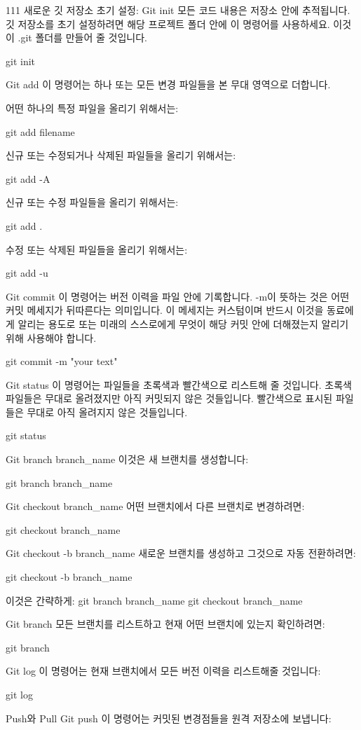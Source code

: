 111
새로운 깃 저장소 초기 설정: Git init
모든 코드 내용은 저장소 안에 추적됩니다. 깃 저장소를 초기 설정하려면 해당 프로젝트 폴더 안에 이 명령어를 사용하세요. 이것이 .git 폴더를 만들어 줄 것입니다.

git init

Git add
이 명령어는 하나 또는 모든 변경 파일들을 본 무대 영역으로 더합니다.

어떤 하나의 특정 파일을 올리기 위해서는:

git add filename

신규 또는 수정되거나 삭제된 파일들을 올리기 위해서는:

git add -A

신규 또는 수정 파일들을 올리기 위해서는:

git add .

수정 또는 삭제된 파일들을 올리기 위해서는:

git add -u

Git commit
이 명령어는 버전 이력을 파일 안에 기록합니다. -m이 뜻하는 것은 어떤 커밋 메세지가 뒤따른다는 의미입니다. 이 메세지는 커스텀이며 반드시 이것을 동료에게 알리는 용도로 또는 미래의 스스로에게 무엇이 해당 커밋 안에 더해졌는지 알리기 위해 사용해야 합니다.

git commit -m "your text"

Git status
이 명령어는 파일들을 초록색과 빨간색으로 리스트해 줄 것입니다. 초록색 파일들은 무대로 올려졌지만 아직 커밋되지 않은 것들입니다. 빨간색으로 표시된 파일들은 무대로 아직 올려지지 않은 것들입니다.

git status

Git branch branch_name
이것은 새 브랜치를 생성합니다:

git branch branch_name

Git checkout branch_name
어떤 브랜치에서 다른 브랜치로 변경하려면:

git checkout branch_name

Git checkout -b branch_name
새로운 브랜치를 생성하고 그것으로 자동 전환하려면:

git checkout -b branch_name

이것은 간략하게:
git branch branch_name
git checkout branch_name


Git branch
모든 브랜치를 리스트하고 현재 어떤 브랜치에 있는지 확인하려면:

git branch

Git log
이 명령어는 현재 브랜치에서 모든 버전 이력을 리스트해줄 것입니다:

git log

Push와 Pull
Git push
이 명령어는 커밋된 변경점들을 원격 저장소에 보냅니다:

